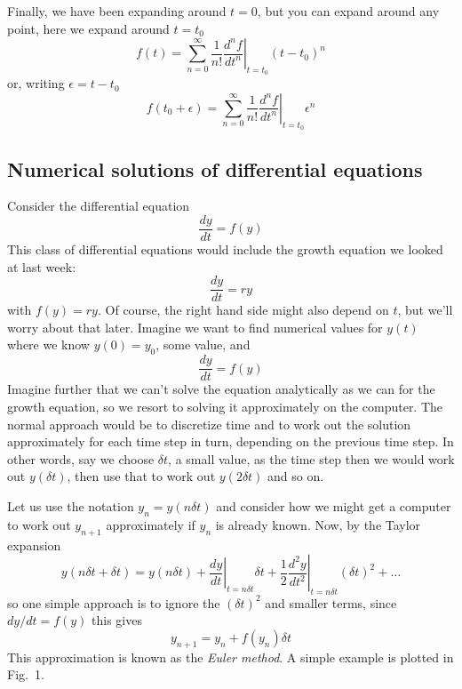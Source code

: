 \documentclass[12pt]{article}
\begin{document}
Finally, we have been expanding around $t=0$, but you can expand around any point, here we expand around $t=t_0$
\begin{equation}
f(t)=\sum_{n=0}^\infty\frac{1}{n!}\left.\frac{d^nf}{dt^n}\right|_{t=t_0}(t-t_0)^n
\end{equation}
or, writing $\epsilon=t-t_0$
\begin{equation}
f(t_0+\epsilon)=\sum_{n=0}^\infty\frac{1}{n!}\left.\frac{d^nf}{dt^n}\right|_{t=t_0}\epsilon^n
\end{equation}

\subsection*{Numerical solutions of differential equations}

Consider the differential equation
\begin{equation}
\frac{dy}{dt}=f(y)
\end{equation}
This class of differential equations would include the growth equation we looked at last week:
\begin{equation}
\frac{dy}{dt}=ry
\end{equation}
with $f(y)=ry$. Of course, the right hand side might also depend on
$t$, but we'll worry about that later. Imagine we want to find
numerical values for $y(t)$ where we know $y(0)=y_0$, some value, and
\begin{equation}
\frac{dy}{dt}=f(y)
\end{equation}
Imagine further that we can't solve the equation analytically as we can
for the growth equation, so we resort to solving it approximately on
the computer. The normal approach would be to discretize time and to
work out the solution approximately for each time step in turn,
depending on the previous time step. In other words, say we choose
$\delta t$, a small value, as the time step then we would work out
$y(\delta t)$, then use that to work out $y(2\delta t)$ and so on.

Let us use the notation $y_n=y(n\delta t)$ and consider how we might
get a computer to work out $y_{n+1}$ approximately if $y_n$ is already
known. Now, by the Taylor expansion
\begin{equation}
y(n\delta t+\delta t)=y(n\delta
t)+\left.\frac{dy}{dt}\right|_{t=n\delta t}\delta
t+\frac{1}{2}\left.\frac{d^2y}{dt^2}\right|_{t=n\delta t}(\delta t)^2+\ldots
\end{equation}
so one simple approach is to ignore the $(\delta t)^2$ and smaller terms, since $dy/dt=f(y)$ this gives
\begin{equation}
y_{n+1}=y_n+f(y_n)\delta t
\end{equation}
This approximation is known as the \textsl{Euler method}. A simple example is plotted in Fig.~1.
\end{document}

